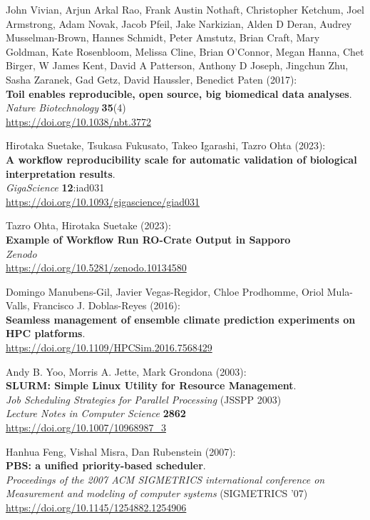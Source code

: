 \documentclass[10pt,letterpaper]{article}
\begin{document}
\begin{thebibliography}{10}
\begin{small}
John Vivian, Arjun Arkal Rao, Frank Austin Nothaft, Christopher Ketchum, Joel Armstrong, Adam Novak, Jacob Pfeil, Jake Narkizian, Alden D Deran, Audrey Musselman-Brown, Hannes Schmidt, Peter Amstutz, Brian Craft, Mary Goldman, Kate Rosenbloom, Melissa Cline, Brian O'Connor, Megan Hanna, Chet Birger, W James Kent, David A Patterson, Anthony D Joseph, Jingchun Zhu, Sasha Zaranek, Gad Getz, David Haussler, Benedict Paten (2017):\\
\textbf{Toil enables reproducible, open source, big biomedical data analyses}.\\
\emph{Nature Biotechnology} \textbf{35}(4)\\
\url{https://doi.org/10.1038/nbt.3772}

 Hirotaka Suetake, Tsukasa Fukusato, Takeo Igarashi, Tazro Ohta (2023):\\
\textbf{A workflow reproducibility scale for automatic validation of biological interpretation results}.\\
\emph{GigaScience} \textbf{12}:iad031\\
\url{https://doi.org/10.1093/gigascience/giad031}

Tazro Ohta, Hirotaka Suetake (2023):\\
\textbf{Example of Workflow Run RO-Crate Output in Sapporo}\\
\emph{Zenodo}\\
\url{https://doi.org/10.5281/zenodo.10134580}


Domingo Manubens-Gil, Javier Vegas-Regidor, Chloe Prodhomme, Oriol Mula-Valls, Francisco J. Doblas-Reyes (2016):\\
\textbf{Seamless management of ensemble climate prediction experiments on HPC platforms}.\\
\url{https://doi.org/10.1109/HPCSim.2016.7568429}

Andy B. Yoo, Morris A. Jette, Mark Grondona (2003):\\
\textbf{SLURM: Simple Linux Utility for Resource Management}.\\
\emph{Job Scheduling Strategies for Parallel Processing} (JSSPP 2003)\\
\emph{Lecture Notes in Computer Science} \textbf{2862}\\
\url{https://doi.org/10.1007/10968987_3}


Hanhua Feng, Vishal Misra, Dan Rubenstein (2007):\\
\textbf{PBS: a unified priority-based scheduler}.\\
\emph{Proceedings of the 2007 ACM SIGMETRICS international conference on Measurement and modeling of computer systems} (SIGMETRICS '07)\\
\url{https://doi.org/10.1145/1254882.1254906} 




\end{small}
\end{thebibliography}
\end{document}
